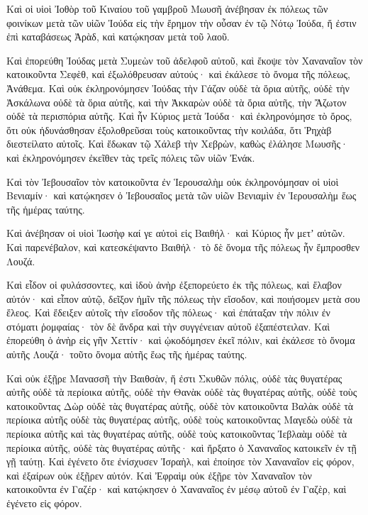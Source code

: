 {\par }{\PP {}Καὶ οἱ υἱοὶ Ἰοθὸρ τοῦ Κιναίου τοῦ γαμβροῦ Μωυσῆ ἀνέβησαν ἐκ πόλεως τῶν φοινίκων μετὰ τῶν υἱῶν Ἰούδα εἰς τὴν ἔρημον τὴν οὖσαν ἐν τῷ Νότῳ Ἰούδα, ἥ ἐστιν ἐπὶ καταβάσεως Ἀρὰδ, καὶ κατῴκησαν μετὰ τοῦ λαοῦ.
\par }{\PP {}Καὶ ἐπορεύθη Ἰούδας μετὰ Συμεὼν τοῦ ἀδελφοῦ αὐτοῦ, καὶ ἔκοψε τὸν Χαναναῖον τὸν κατοικοῦντα Σεφὲθ, καὶ ἐξωλόθρευσαν αὐτούς· καὶ ἐκάλεσε τὸ ὄνομα τῆς πόλεως, Ἀνάθεμα.
Καὶ οὐκ ἐκληρονόμησεν Ἰούδας τὴν Γάζαν οὐδὲ τὰ ὅρια αὐτῆς, οὐδὲ τὴν Ἀσκάλωνα οὐδὲ τὰ ὅρια αὐτῆς, καὶ τὴν Ἀκκαρὼν οὐδὲ τὰ ὅρια αὐτῆς, τὴν Ἄζωτον οὐδὲ τὰ περισπόρια αὐτῆς.
Καὶ ἦν Κύριος μετὰ Ἰούδα· καὶ ἐκληρονόμησε τὸ ὄρος, ὅτι οὐκ ἠδυνάσθησαν ἐξολοθρεῦσαι τοὺς κατοικοῦντας τὴν κοιλάδα, ὅτι Ῥηχὰβ διεστείλατο αὐτοῖς.
Καὶ ἔδωκαν τῷ Χάλεβ τὴν Χεβρὼν, καθὼς ἐλάλησε Μωυσῆς· καὶ ἐκληρονόμησεν ἐκεῖθεν τὰς τρεῖς πόλεις τῶν υἱῶν Ἐνάκ.
\par }{\PP {}Καὶ τὸν Ἰεβουσαῖον τὸν κατοικοῦντα ἐν Ἱερουσαλὴμ οὐκ ἐκληρονόμησαν οἱ υἱοὶ Βενιαμίν· καὶ κατῴκησεν ὁ Ἰεβουσαῖος μετὰ τῶν υἱῶν Βενιαμὶν ἐν Ἱερουσαλὴμ ἕως τῆς ἡμέρας ταύτης.
\par }{\PP {}Καὶ ἀνέβησαν οἱ υἱοὶ Ἰωσὴφ καί γε αὐτοὶ εἰς Βαιθήλ· καὶ Κύριος ἦν μετʼ αὐτῶν.
Καὶ παρενέβαλον, καὶ κατεσκέψαντο Βαιθήλ· τὸ δὲ ὄνομα τῆς πόλεως ἦν ἔμπροσθεν Λουζά.
\par }{\PP {}Καὶ εἶδον οἱ φυλάσσοντες, καὶ ἰδοὺ ἀνὴρ ἐξεπορεύετο ἐκ τῆς πόλεως, καὶ ἔλαβον αὐτόν· καὶ εἶπον αὐτῷ, δεῖξον ἡμῖν τῆς πόλεως τὴν εἴσοδον, καὶ ποιήσομεν μετὰ σου ἔλεος.
Καὶ ἔδειξεν αὐτοῖς τὴν εἴσοδον τῆς πόλεως· καὶ ἐπάταξαν τὴν πόλιν ἐν στόματι ῥομφαίας· τὸν δὲ ἄνδρα καὶ τὴν συγγένειαν αὐτοῦ ἐξαπέστειλαν.
Καὶ ἐπορεύθη ὁ ἀνὴρ εἰς γῆν Χεττίν· καὶ ᾠκοδόμησεν ἐκεῖ πόλιν, καὶ ἐκάλεσε τὸ ὄνομα αὐτῆς Λουζά· τοῦτο ὄνομα αὐτῆς ἕως τῆς ἡμέρας ταύτης.
\par }{\PP {}Καὶ οὐκ ἐξῇρε Μανασσῆ τὴν Βαιθσὰν, ἥ ἐστι Σκυθῶν πόλις, οὐδὲ τὰς θυγατέρας αὐτῆς οὐδὲ τὰ περίοικα αὐτῆς, οὐδὲ τὴν Θανὰκ οὐδὲ τὰς θυγατέρας αὐτῆς, οὐδὲ τοὺς κατοικοῦντας Δὼρ οὐδὲ τὰς θυγατέρας αὐτῆς, οὐδὲ τὸν κατοικοῦντα Βαλὰκ οὐδὲ τὰ περίοικα αὐτῆς οὐδὲ τὰς θυγατέρας αὐτῆς, οὐδὲ τοὺς κατοικοῦντας Μαγεδὼ οὐδὲ τὰ περίοικα αὐτῆς καὶ τὰς θυγατέρας αὐτῆς, οὐδὲ τοὺς κατοικοῦντας Ἰεβλαὰμ οὐδὲ τὰ περίοικα αὐτῆς, οὐδὲ τὰς θυγατέρας αὐτῆς· καὶ ἤρξατο ὁ Χαναναῖος κατοικεῖν ἐν τῇ γῇ ταύτῃ.
Καὶ ἐγένετο ὅτε ἐνίσχυσεν Ἰσραὴλ, καὶ ἐποίησε τὸν Χαναναῖον εἰς φόρον, καὶ ἐξαίρων οὐκ ἐξῇρεν αὐτόν.
Καὶ Ἐφραὶμ οὐκ ἐξῇρε τὸν Χαναναῖον τὸν κατοικοῦντα ἐν Γαζέρ· καὶ κατῴκησεν ὁ Χαναναῖος ἐν μέσῳ αὐτοῦ ἐν Γαζὲρ, καὶ ἐγένετο εἰς φόρον.
}
